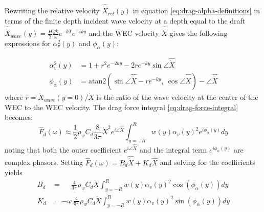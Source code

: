 Rewriting the relative velocity $\hat{\dot{X}}_{rel}(y)$ in equation \eqref{eq:drag-alpha-definitions} in terms of the finite depth incident wave velocity at a depth equal to the draft $\hat{\dot{X}}_{wave}(y) = \frac{H}{2} \frac{g k}{\omega} e^{-kT} e^{-iky}$ and the WEC velocity $\hat{\dot{X}}$ gives the following expressions for $\alpha_v^2(y)$ and $\phi_\alpha(y)$:

\begin{equation}
\begin{aligned}
    \alpha_v^2(y) &= 1 + r^2 e^{-2ky} - 2 r e^{-ky}  \sin\angle \hat{\dot{X}} \\
    \phi_\alpha(y) &= \mathrm{atan2}\left( \sin\angle \hat{\dot{X}} - r e^{-ky}, ~\cos\angle \hat{\dot{X}}\right) -  \angle\hat{\dot{X}}
\end{aligned}
\end{equation}
where $r = \dot{X}_{wave}(y=0)/ \dot{X}$ is the ratio of the wave velocity at the center of the WEC to the WEC velocity.
The drag force integral \eqref{eq:drag-force-integral} becomes:
\begin{equation}
    \hat{F}_d(\omega) \approx  \frac{1}{2} \rho_w C_d \frac{8}{3\pi}\dot{X}^2 e^{i\angle\hat{\dot{X}}}\int_{y=-R}^{R} w(y) \alpha_v(y)^2  e^{i\phi_\alpha(y)}dy
\end{equation}
noting that both the outer coefficient $e^{i\angle\hat{\dot{X}}}$ and the integral term $e^{i\phi_\alpha(y)}$ are complex phasors.
Setting $\hat{F}_{d}(\omega)%
=B_{d} \hat{\dot{X}} + K_{d} \hat{X}$ and solving for the coefficients yields
\begin{equation}\label{eq:drag-coeffs}
\begin{aligned}
B_{d} &= ~~~~~~\frac{4}{3\pi} \rho_w  C_{d} \dot{X} \int_{y=-R}^{R} w(y) \alpha_v(y)^2  \cos(\phi_\alpha(y))dy \\ %
K_{d} &= - \omega~\frac{4}{3\pi} \rho_w  C_{d} \dot{X} \int_{y=-R}^{R} w(y) \alpha_v(y)^2  \sin(\phi_\alpha(y))dy \\ %
\end{aligned}
\end{equation}

